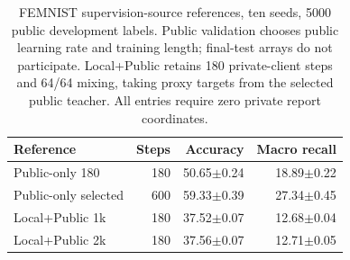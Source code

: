 \begin{table}[t]
\caption{FEMNIST supervision-source references, ten seeds, 5000 public development labels. Public validation chooses public learning rate and training length; final-test arrays do not participate. Local+Public retains 180 private-client steps and 64/64 mixing, taking proxy targets from the selected public teacher. All entries require zero private report coordinates.}
\label{tab:femnist-public}\small
\centering
\begin{tabular}{@{}lrrr@{}}\toprule
Reference & Steps & Accuracy & Macro recall \\
\midrule
Public-only 180 & 180 & 50.65$\pm$0.24 & 18.89$\pm$0.22 \\
Public-only selected & 600 & 59.33$\pm$0.39 & 27.34$\pm$0.45 \\
Local+Public 1k & 180 & 37.52$\pm$0.07 & 12.68$\pm$0.04 \\
Local+Public 2k & 180 & 37.56$\pm$0.07 & 12.71$\pm$0.05 \\
\bottomrule\end{tabular}
\end{table}
